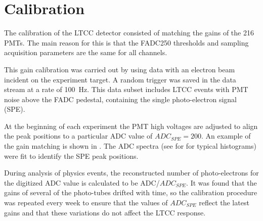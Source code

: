 \section{Calibration}

The calibration of the LTCC detector consisted of matching the gains of the 216 PMTs. The main reason for this
is that the FADC250 thresholds and sampling acquisition parameters are the same for all channels.

This gain calibration was carried out by using data with an electron beam incident on the experiment target. A
random trigger was saved in the data stream at a rate of 100~Hz. This data subset includes LTCC events with
PMT noise above the FADC pedestal, containing the single photo-electron signal (SPE).

At the beginning of each experiment the PMT high voltages are adjusted to align the peak positions to a particular
ADC value of $ADC_{SPE} = 200$. An example of the gain matching is shown in . The ADC spectra
(see for  for typical histograms) were fit to identify the SPE peak positions.

During analysis of physics events, the reconstructed number of photo-electrons for the digitized ADC value is
calculated to be ADC/$ADC_{SPE}$. It was found that the gains of several of the photo-tubes drifted with time, so
the calibration procedure was repeated every week to ensure that the values of $ADC_{SPE}$ reflect the latest
gains and that these variations do not affect the LTCC response.

